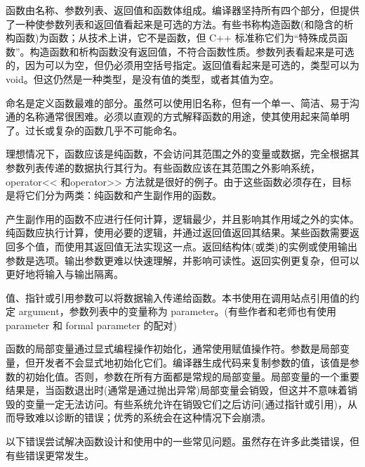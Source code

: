 函数由名称、参数列表、返回值和函数体组成。编译器坚持所有四个部分，但提供了一种使参数列表和返回值看起来是可选的方法。有些书称构造函数(和隐含的析构函数)为函数；从技术上讲，它不是函数，但 C++ 标准称它们为“特殊成员函数”。构造函数和析构函数没有返回值，不符合函数性质。参数列表看起来是可选的，因为可以为空，但仍必须用空括号指定。返回值看起来是可选的，类型可以为 void。但这仍然是一种类型，是没有值的类型，或者其值为空。

命名是定义函数最难的部分。虽然可以使用旧名称，但有一个单一、简洁、易于沟通的名称通常很困难。必须以直观的方式解释函数的用途，使其使用起来简单明了。过长或复杂的函数几乎不可能命名。

理想情况下，函数应该是纯函数，不会访问其范围之外的变量或数据，完全根据其参数列表传递的数据执行其行为。有些函数应该在其范围之外影响系统，operator<{}< 和operator>{}> 方法就是很好的例子。由于这些函数必须存在，目标是将它们分为两类：纯函数和产生副作用的函数。

产生副作用的函数不应进行任何计算，逻辑最少，并且影响其作用域之外的实体。纯函数应执行计算，使用必要的逻辑，并通过返回值返回其结果。某些函数需要返回多个值，而使用其返回值无法实现这一点。返回结构体(或类)的实例或使用输出参数是选项。输出参数更难以快速理解，并影响可读性。返回实例更复杂，但可以更好地将输入与输出隔离。

值、指针或引用参数可以将数据输入传递给函数。本书使用在调用站点引用值的约定 argument，参数列表中的变量称为 parameter。(有些作者和老师也有使用 parameter 和 formal parameter 的配对)

函数的局部变量通过显式编程操作初始化，通常使用赋值操作符。参数是局部变量，但开发者不会显式地初始化它们。编译器生成代码来复制参数的值，该值是参数的初始化值。否则，参数在所有方面都是常规的局部变量。局部变量的一个重要结果是，当函数退出时(通常是通过抛出异常)局部变量会销毁，但这并不意味着销毁的变量一定无法访问。有些系统允许在销毁它们之后访问(通过指针或引用)，从而导致难以诊断的错误；优秀的系统会在这种情况下会崩溃。

以下错误尝试解决函数设计和使用中的一些常见问题。虽然存在许多此类错误，但有些错误更常发生。
